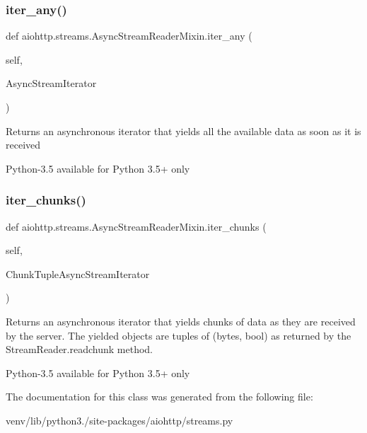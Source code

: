 \subsubsection{\texorpdfstring{iter\+\_\+any()}{iter\_any()}}
{\footnotesize\ttfamily def aiohttp.\+streams.\+Async\+Stream\+Reader\+Mixin.\+iter\+\_\+any (\begin{DoxyParamCaption}\item[{}]{self,  }\item[{}]{Async\+Stream\+Iterator }\end{DoxyParamCaption})}

\begin{DoxyVerb}Returns an asynchronous iterator that yields all the available
data as soon as it is received

Python-3.5 available for Python 3.5+ only
\end{DoxyVerb}
 \mbox{\label{classaiohttp_1_1streams_1_1_async_stream_reader_mixin_a2eeaa27b3924bfdaf7a3d0a5cfcc2ea6}} 
\subsubsection{\texorpdfstring{iter\+\_\+chunks()}{iter\_chunks()}}
{\footnotesize\ttfamily def aiohttp.\+streams.\+Async\+Stream\+Reader\+Mixin.\+iter\+\_\+chunks (\begin{DoxyParamCaption}\item[{}]{self,  }\item[{}]{Chunk\+Tuple\+Async\+Stream\+Iterator }\end{DoxyParamCaption})}

\begin{DoxyVerb}Returns an asynchronous iterator that yields chunks of data
as they are received by the server. The yielded objects are tuples
of (bytes, bool) as returned by the StreamReader.readchunk method.

Python-3.5 available for Python 3.5+ only
\end{DoxyVerb}
 

The documentation for this class was generated from the following file\+:\begin{DoxyCompactItemize}
\item 
venv/lib/python3./site-\/packages/aiohttp/streams.\+py\end{DoxyCompactItemize}
